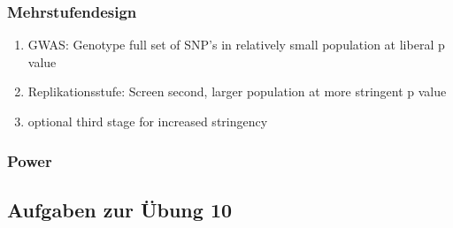 \subsubsection{Mehrstufendesign}
\begin{enumerate}
	\item GWAS: Genotype full set of SNP's in relatively small population at liberal p value
	\item Replikationsstufe: Screen second, larger population at more stringent p value
	\item optional third stage for increased stringency
\end{enumerate}

\subsubsection{Power}

\subsection{Aufgaben zur Übung 10}